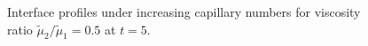 \begin{figure}[t]
 \begin{center}
 \end{center}
 \caption{Interface profiles under increasing capillary numbers for viscosity ratio $\tilde{\mu}_2/\tilde{\mu}_1=0.5$ at $t=5$.}
 \label{fig: meniscus 2a}
\end{figure}

%

